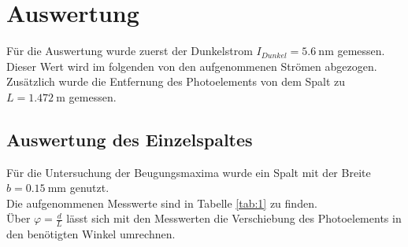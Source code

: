 \section{Auswertung}

\noindent Für die Auswertung wurde zuerst der Dunkelstrom $I_{Dunkel}=\SI{5.6}{\nano\metre}$ gemessen. Dieser Wert wird im folgenden von den aufgenommenen Strömen abgezogen.\\
Zusätzlich wurde die Entfernung des Photoelements von dem Spalt zu $L=\SI{1.472}{\metre}$ gemessen.

\subsection{Auswertung des Einzelspaltes}

\noindent Für die Untersuchung der Beugungsmaxima wurde ein Spalt mit der Breite $b=\SI{0.15}{\milli\metre}$ genutzt.\\
Die aufgenommenen Messwerte sind in Tabelle \ref{tab:1} zu finden.\\ Über $\varphi=\frac{d}{L}$ lässt sich mit den Messwerten die Verschiebung des Photoelements in den benötigten Winkel umrechnen.

